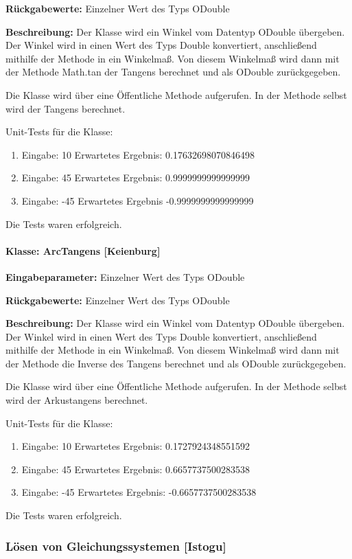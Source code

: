 \textbf{Rückgabewerte: } Einzelner Wert des Typs ODouble

\textbf{Beschreibung: } Der Klasse wird ein Winkel vom Datentyp ODouble übergeben. Der Winkel wird in einen Wert des Typs Double konvertiert, anschließend mithilfe der Methode  in ein Winkelmaß. Von diesem Winkelmaß wird dann mit der Methode Math.tan der Tangens berechnet und als ODouble zurückgegeben.  

Die Klasse wird über eine Öffentliche Methode aufgerufen. In der Methode selbst wird der Tangens berechnet. 

Unit-Tests für die Klasse: 	
\begin{enumerate}
	\item Eingabe:  10 Erwartetes Ergebnis: 0.17632698070846498
	\item Eingabe:  45 Erwartetes Ergebnis: 0.9999999999999999
	\item Eingabe: -45 Erwartetes Ergebnis -0.9999999999999999
\end{enumerate}
Die Tests waren erfolgreich.

\paragraph{Klasse: ArcTangens [Keienburg]}
\textbf{Eingabeparameter: } Einzelner Wert des Typs ODouble

\textbf{Rückgabewerte: } Einzelner Wert des Typs ODouble

\textbf{Beschreibung: }Der Klasse wird ein Winkel vom Datentyp ODouble übergeben. Der Winkel wird in einen Wert des Typs Double konvertiert, anschließend mithilfe der Methode  in ein Winkelmaß. Von diesem Winkelmaß wird dann mit der Methode  die Inverse des Tangens berechnet und als ODouble zurückgegeben. 
 
Die Klasse wird über eine Öffentliche Methode aufgerufen. In der Methode selbst wird der Arkustangens berechnet. 

Unit-Tests für die Klasse: 	
\begin{enumerate}
	\item Eingabe:  10 Erwartetes Ergebnis: 0.1727924348551592
	\item Eingabe:  45 Erwartetes Ergebnis: 0.6657737500283538
	\item Eingabe: -45 Erwartetes Ergebnis: -0.6657737500283538
\end{enumerate}
Die Tests waren erfolgreich.

\subsubsection{Lösen von Gleichungssystemen [Istogu]}

